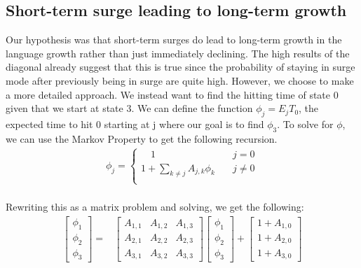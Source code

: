 \documentclass[12pt]{article}
\begin{document}
\subsection{Short-term surge leading to long-term growth}
Our hypothesis was that short-term surges do lead to long-term growth in the language growth rather than just immediately declining. The high results of the diagonal already suggest that this is true since the probability of staying in surge mode after previously being in surge are quite high. However, we choose to make a more detailed approach. We instead want to find the hitting time of state 0 given that we start at state 3. We can define the function $\phi_j = E_j T_0$, the expected time to hit 0 starting at j where our goal is to find $\phi_3$. To solve for $\phi$, we can use the Markov Property to get the following recursion.
\begin{align*}
\phi_j = \begin{cases}
       \quad 1 &\quad j = 0\\
       1+\sum_{k \neq j} A_{j,k}\phi_k &\quad j \neq 0 \\
     \end{cases}
\end{align*}\\
Rewriting this as a matrix problem and solving, we get the following:\\
\begin{align*}
    \begin{bmatrix} \phi_1 \\ \phi_2 \\ \phi_3 \end{bmatrix}  =& \begin{bmatrix} A_{1,1}  & A_{1,2} & A_{1,3} \\ A_{2,1} & A_{2,2} & A_{2,3} \\ A_{3,1} & A_{3,2} & A_{3,3} \end{bmatrix} \begin{bmatrix} \phi_1 \\ \phi_2 \\ \phi_3 \end{bmatrix} + \begin{bmatrix}1+A_{1,0} \\ 1+A_{2,0} \\ 1+A_{3,0}\end{bmatrix}\\\\
\end{align*}
\end{document}
